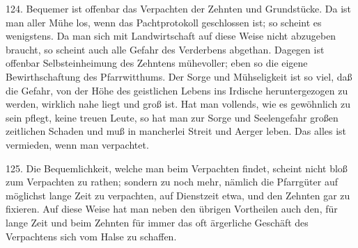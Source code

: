 124. Bequemer ist offenbar das Verpachten der Zehnten und Grundstücke. Da ist man aller Mühe los, wenn das Pachtprotokoll geschlossen ist; so scheint es wenigstens. Da man sich mit Landwirtschaft auf diese Weise nicht abzugeben braucht, so scheint auch alle Gefahr des Verderbens abgethan. Dagegen ist offenbar Selbsteinheimung des Zehntens mühevoller; eben so die eigene Bewirthschaftung des Pfarrwitthums. Der Sorge und Mühseligkeit ist so viel, daß die Gefahr, von der Höhe des geistlichen Lebens ins Irdische heruntergezogen zu werden, wirklich nahe liegt und groß ist. Hat man vollends, wie es gewöhnlich zu sein pflegt, keine treuen Leute, so hat man zur Sorge und Seelengefahr großen zeitlichen Schaden und muß in mancherlei Streit und Aerger leben. Das alles ist vermieden, wenn man verpachtet.

125. Die Bequemlichkeit, welche man beim Verpachten findet, scheint nicht bloß zum Verpachten zu rathen; sondern zu noch mehr, nämlich die Pfarrgüter auf möglichst lange Zeit zu verpachten, auf Dienstzeit etwa, und den Zehnten gar zu fixieren. Auf diese Weise hat man neben den übrigen Vortheilen auch den, für lange Zeit und beim Zehnten für immer das oft ärgerliche Geschäft des Verpachtens sich vom Halse zu schaffen.

